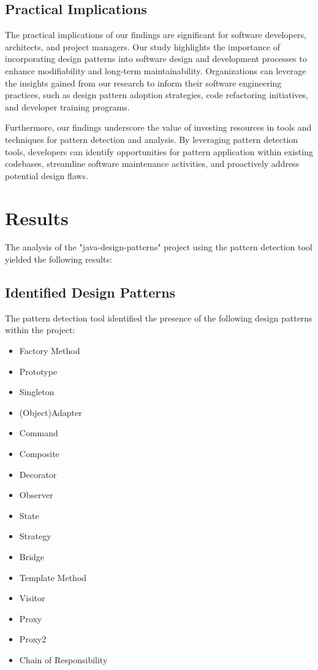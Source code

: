 \documentclass[conference]{IEEEtran}
\begin{document}
	\subsection{Practical Implications}
	
	The practical implications of our findings are significant for software developers, architects, and project managers. Our study highlights the importance of incorporating design patterns into software design and development processes to enhance modifiability and long-term maintainability. Organizations can leverage the insights gained from our research to inform their software engineering practices, such as design pattern adoption strategies, code refactoring initiatives, and developer training programs.
	
	Furthermore, our findings underscore the value of investing resources in tools and techniques for pattern detection and analysis. By leveraging pattern detection tools, developers can identify opportunities for pattern application within existing codebases, streamline software maintenance activities, and proactively address potential design flaws.
	
	\section{Results}
	
	The analysis of the "java-design-patterns" project using the pattern detection tool yielded the following results:
	
	\subsection{Identified Design Patterns}
	
	The pattern detection tool identified the presence of the following design patterns within the project:
	
	\begin{itemize}
		\item Factory Method
		\item Prototype
		\item Singleton
		\item (Object)Adapter
		\item Command
		\item Composite
		\item Decorator
		\item Observer
		\item State
		\item Strategy
		\item Bridge
		\item Template Method
		\item Visitor
		\item Proxy
		\item Proxy2
		\item Chain of Responsibility
	\end{itemize}
	
\end{document}
